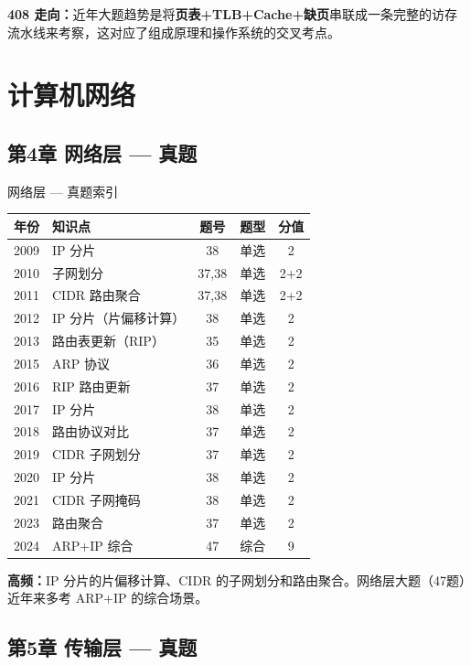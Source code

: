 \noindent\textbf{408 走向：}近年大题趋势是将\textbf{页表+TLB+Cache+缺页}串联成一条完整的访存流水线来考察，这对应了组成原理和操作系统的交叉考点。

\section{计算机网络}

\subsection*{第4章 网络层 — 真题}

\begin{tablebox}{网络层 — 真题索引}
\centering
\begin{tabular}{|c|l|c|c|c|}
\hline
年份 & 知识点 & 题号 & 题型 & 分值 \\
\hline
2009 & IP 分片 & 38 & 单选 & 2 \\
2010 & 子网划分 & 37,38 & 单选 & 2+2 \\
2011 & CIDR 路由聚合 & 37,38 & 单选 & 2+2 \\
2012 & IP 分片（片偏移计算）& 38 & 单选 & 2 \\
2013 & 路由表更新（RIP）& 35 & 单选 & 2 \\
2015 & ARP 协议 & 36 & 单选 & 2 \\
2016 & RIP 路由更新 & 37 & 单选 & 2 \\
2017 & IP 分片 & 38 & 单选 & 2 \\
2018 & 路由协议对比 & 37 & 单选 & 2 \\
2019 & CIDR 子网划分 & 37 & 单选 & 2 \\
2020 & IP 分片 & 38 & 单选 & 2 \\
2021 & CIDR 子网掩码 & 38 & 单选 & 2 \\
2023 & 路由聚合 & 37 & 单选 & 2 \\
2024 & ARP+IP 综合 & 47 & 综合 & 9 \\
\hline
\end{tabular}
\end{tablebox}

\noindent\textbf{高频：}IP 分片的片偏移计算、CIDR 的子网划分和路由聚合。网络层大题（47题）近年来多考 ARP+IP 的综合场景。

\subsection*{第5章 传输层 — 真题}

